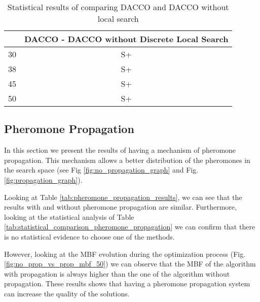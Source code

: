 		\begin{table}[!htdp]
				\begin{center}
					\begin{tabular}{| c | c |}
						\hline
						~ & \multicolumn{1}{p{4cm}|}{\textbf{DACCO - DACCO without Discrete Local Search}} \\ \hline
						30 & S+ \\ \hline
						38 & S+ \\ \hline
						45 & S+ \\ \hline
						50 & S+ \\ \hline
					\end{tabular}
					\caption{Statistical results of comparing DACCO and DACCO without local search}
					\label{tab:statistical_comparison_discrete_local_search}
				\end{center}
		\end{table}
		
		
		\pagebreak
		
		\subsection{Pheromone Propagation}
		
		In this section we present the results of having a mechanism of pheromone propagation. This mechanism allows a better distribution of the pheromones in the search space (see Fig \ref{fig:no_propagation_graph} and Fig.\ref{fig:propagation_graph}).
		
		Looking at Table \ref{tab:pheromone_propagation_results}, we can see that the results with and without pheromone propagation are similar. Furthermore, looking at the statistical analysis of Table \ref{tab:statistical_comparison_pheromone_propagation} we can confirm that there is no statistical evidence to choose one of the methods. 
		
		However, looking at the MBF evolution during the optimization process (Fig. \ref{fig:no_prop_vs_prop_mbf_50}) we can observe that the MBF of the algorithm with propagation is always higher than the one of the algorithm without propagation. These results shows that having a pheromone propagation system can increase the quality of the solutions.
		
		
